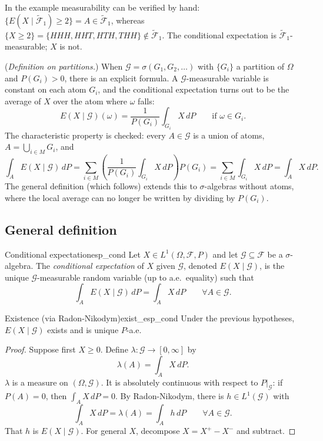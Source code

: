 \documentclass[11pt, a4paper]{article}
\begin{document}
\obs In the example measurability can be verified by hand:
$\{E(X \mid \widetilde{\mathcal{F}}_1) \ge 2\} = A \in \widetilde{\mathcal{F}}_1$, whereas
$\{X \ge 2\} = \{HHH, HHT, HTH, THH\} \notin \widetilde{\mathcal{F}}_1$. The conditional
expectation is $\widetilde{\mathcal{F}}_1$-measurable; $X$ is not.

\obs (\emph{Definition on partitions.}) When $\mathcal{G} = \sigma(G_1, G_2, \dots)$ with
$\{G_i\}$ a partition of $\Omega$ and $P(G_i) > 0$, there is an explicit formula. A
$\mathcal{G}$-measurable variable is constant on each atom $G_i$, and the conditional expectation turns out
to be the average of $X$ over the atom where $\omega$ falls:
$$ E(X \mid \mathcal{G})(\omega) = \frac{1}{P(G_i)} \int_{G_i} X \, dP \qquad \text{if }
\omega \in G_i. $$
The characteristic property is checked: every $A \in \mathcal{G}$ is a union of atoms,
$A = \bigcup_{i \in M} G_i$, and
$$ \int_A E(X \mid \mathcal{G}) \, dP = \sum_{i \in M} \left( \frac{1}{P(G_i)} \int_{G_i} X \,
dP \right) P(G_i) = \sum_{i \in M} \int_{G_i} X \, dP = \int_A X \, dP. $$
The general definition (which follows) extends this to $\sigma$-algebras without atoms, where the
local average can no longer be written by dividing by $P(G_i)$.

\subsection{General definition}

\begin{definicion}{Conditional expectation}{esp_cond}
Let $X \in L^1(\Omega, \mathcal{F}, P)$ and let $\mathcal{G} \subseteq \mathcal{F}$ be a
$\sigma$-algebra. The \emph{conditional expectation} of $X$ given $\mathcal{G}$, denoted
$E(X \mid \mathcal{G})$, is the unique $\mathcal{G}$-measurable random variable (up to a.e.\ equality)
such that
$$ \int_A E(X \mid \mathcal{G}) \, dP = \int_A X \, dP \qquad \forall A \in \mathcal{G}. $$
\end{definicion}

\begin{teorema}{Existence (via Radon-Nikodym)}{exist_esp_cond}
Under the previous hypotheses, $E(X \mid \mathcal{G})$ exists and is unique $P$-a.e.
\end{teorema}

\begin{proof}
Suppose first $X \ge 0$. Define $\lambda: \mathcal{G} \to [0, \infty]$ by
$$ \lambda(A) = \int_A X \, dP. $$
$\lambda$ is a measure on $(\Omega, \mathcal{G})$. It is absolutely continuous with respect to
$P|_{\mathcal{G}}$: if $P(A) = 0$, then $\int_A X \, dP = 0$. By Radon-Nikodym, there is
$h \in L^1(\mathcal{G})$ with
$$ \int_A X \, dP = \lambda(A) = \int_A h \, dP \qquad \forall A \in \mathcal{G}. $$
That $h$ is $E(X \mid \mathcal{G})$. For general $X$, decompose $X = X^+ - X^-$ and subtract.
\end{proof}
\end{document}
